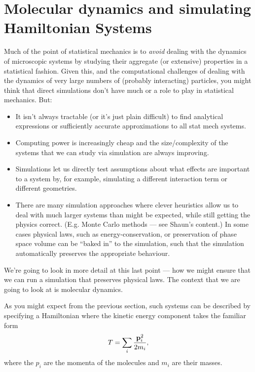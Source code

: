 \section{Molecular dynamics and simulating Hamiltonian Systems}

Much of the point of statistical mechanics is to \emph{avoid} dealing with the dynamics of microscopic systems by studying their aggregate (or extensive) properties in a statistical fashion. Given this, and the computational challenges of dealing with the dynamics of very large numbers of (probably interacting) particles, you might think that direct simulations don't have much or a role to play in statistical mechanics. But:
\begin{itemize}
	\item It isn't always tractable (or it's just plain difficult) to find analytical expressions or sufficiently accurate approximations to all stat mech systems.
	\item Computing power is increasingly cheap and the size/complexity of the systems that we can study via simulation are always improving.
	\item Simulations let us directly test assumptions about what effects are important to a system by, for example, simulating a different interaction term or different geometries.
	\item There are many simulation approaches where clever heuristics allow us to deal with much larger systems than might be expected, while still getting the physics correct. (E.g. Monte Carlo methods --- see Shaun's content.) In some cases physical laws, such as energy-conservation, or preservation of phase space volume can be ``baked in'' to the simulation, such that the simulation automatically preserves the appropriate behaviour.
\end{itemize}

We're going to look in more detail at this last point --- how we might ensure that we can run a simulation that preserves physical laws. The context that we are going to look at is molecular dynamics.

As you might expect from the previous section, such systems can be described by specifying a Hamiltonian where the kinetic energy component takes the familiar form
$$ T = \sum_i \frac{{\bf p}_i^2}{2m_i},$$
where the $p_i$ are the momenta of the molecules and $m_i$ are their masses.

